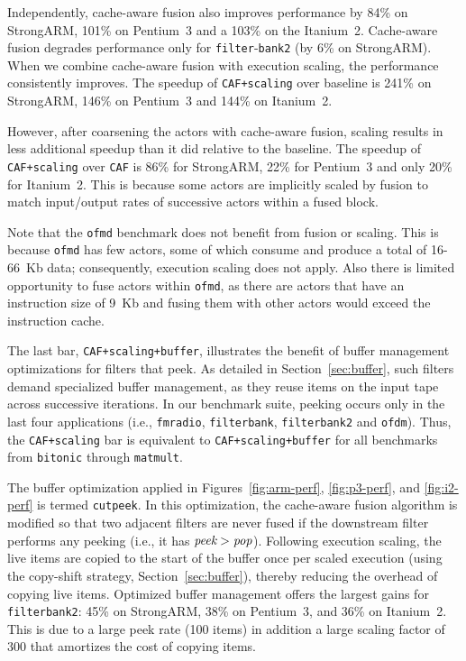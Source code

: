 Independently, cache-aware fusion also improves performance by 84\% on
StrongARM, 101\% on Pentium~3 and a 103\% on the Itanium~2.
Cache-aware fusion degrades performance only for
\texttt{filter}-\texttt{bank2} (by 6\% on StrongARM). When we combine
cache-aware fusion with execution scaling, the performance
consistently improves.  The speedup of \texttt{CAF+scaling} over
baseline is 241\% on StrongARM, 146\% on Pentium~3 and 144\% on
Itanium~2.

However, after coarsening the actors with cache-aware fusion, scaling
results in less additional speedup than it did relative to the
baseline.  The speedup of \texttt{CAF+scaling} over \texttt{CAF} is
86\% for StrongARM, 22\% for Pentium~3 and only 20\% for Itanium~2.
This is because some actors are implicitly scaled by fusion to match
input/output rates of successive actors within a fused block.

Note that the \texttt{ofmd} benchmark does not benefit from fusion or
scaling. This is because \texttt{ofmd} has few actors, some of which
consume and produce a total of 16-66~Kb data; consequently, execution
scaling does not apply.  Also there is limited opportunity to fuse
actors within \texttt{ofmd}, as there are actors that have an
instruction size of 9~Kb and fusing them with other actors would
exceed the instruction cache.

The last bar, {\tt CAF+scaling+buffer}, illustrates the benefit of
buffer management optimizations for filters that peek.  As detailed in
Section~\ref{sec:buffer}, such filters demand specialized buffer
management, as they reuse items on the input tape across successive
iterations.  In our benchmark suite, peeking occurs only in the last
four applications (i.e., \texttt{fmradio}, \texttt{filterbank},
\texttt{filterbank2} and \texttt{ofdm}).  Thus, the {\tt CAF+scaling}
bar is equivalent to {\tt CAF+scaling+buffer} for all benchmarks from
{\tt bitonic} through {\tt matmult}.

The buffer optimization applied in Figures~\ref{fig:arm-perf},
\ref{fig:p3-perf}, and \ref{fig:i2-perf} is termed {\tt cutpeek}.  In
this optimization, the cache-aware fusion algorithm is modified so
that two adjacent filters are never fused if the downstream filter
performs any peeking (i.e., it has $\mbox{\it peek} > \mbox{\it
pop}$).  Following execution scaling, the live items are copied to the
start of the buffer once per scaled execution (using the copy-shift
strategy, Section~\ref{sec:buffer}), thereby reducing the overhead
of copying live items.  Optimized buffer management offers the largest
gains for {\tt filterbank2}: 45\% on StrongARM, 38\% on Pentium~3, and
36\% on Itanium~2.  This is due to a large peek rate (100 items) in
addition a large scaling factor of 300 that amortizes the cost of
copying items.

